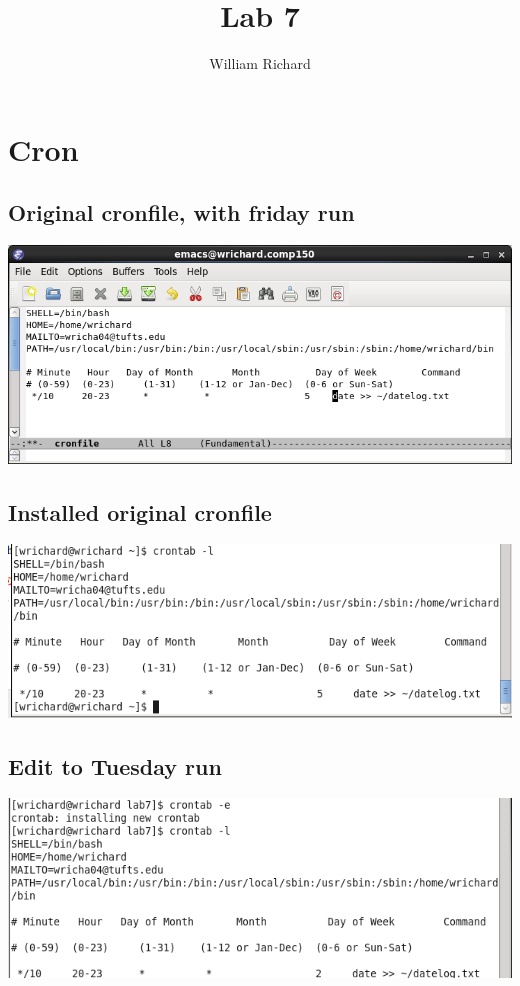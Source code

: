 \documentclass[a4paper,10pt]{article}
\title{Lab 7}
\author{William Richard}
\begin{document}
\maketitle

\section{Cron}
\subsection{Original cronfile, with friday run}
  \begin{center}
  \includegraphics[width=\linewidth]{./fri_cronfile.png}
  \end{center}

\subsection{Installed original cronfile}
  \begin{center}
  \includegraphics[width=\linewidth]{./crontab_list_fri.png}
  \end{center}

\subsection{Edit to Tuesday run}
  \begin{center}
  \includegraphics[width=\linewidth]{./crontab_e.png}
  \end{center}
\end{document}

